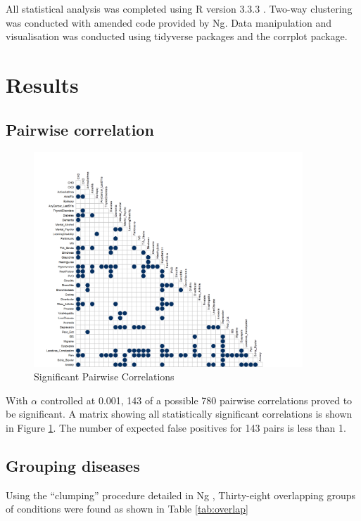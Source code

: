 \documentclass[12pt,]{report}
\begin{document}
All statistical analysis was completed using R version 3.3.3
\citep{RN295}. Two-way clustering was conducted with amended code
provided by Ng\citeyearpar{RN72}. Data manipulation and visualisation
was conducted using tidyverse packages \citep{RN296} and the corrplot
package.

\section{Results}\label{sec:clust-results}

\subsection{Pairwise correlation}\label{subsec:clust-pwcorr}

\begin{figure}
  \centering
    \includegraphics[width=0.9\textwidth]{figures/sd-corrplot.png}
  \caption{Significant Pairwise Correlations}
  \label{fig:corrplot}
\end{figure}

With \(\alpha\) controlled at 0.001, 143 of a possible 780 pairwise
correlations proved to be significant. A matrix showing all
statistically significant correlations is shown in Figure
\ref{fig:corrplot}. The number of expected false positives for 143 pairs
is less than 1.

\subsection{Grouping diseases}\label{subsec:clust-grouping}

Using the ``clumping'' procedure detailed in Ng \citeyearpar{RN72},
Thirty-eight overlapping groups of conditions were found as shown in
Table \ref{tab:overlap}
\end{document}
